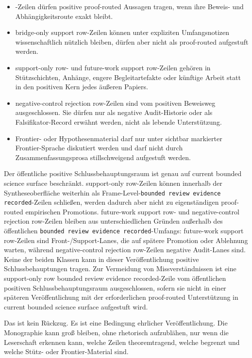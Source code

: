 \begin{itemize}
\item {}-Zeilen dürfen positive proof-routed
      Aussagen tragen, wenn ihre Beweis- und Abhängigkeitsroute exakt bleibt.
\item bridge-only support row-Zeilen können unter expliziten Umfangsnotizen
      wissenschaftlich nützlich bleiben, dürfen aber nicht als proof-routed
      aufgestuft werden.
\item support-only row- und future-work support row-Zeilen gehören in
      Stützschichten, Anhänge, engere Begleitartefakte oder künftige Arbeit
      statt in den positiven Kern jedes äußeren Papiers.
\item negative-control rejection row-Zeilen sind vom positiven Beweisweg ausgeschlossen.
      Sie dürfen nur als negative Audit-Historie oder als Falsifikator-Record
      erwähnt werden, nicht als lebende Unterstützung.
\item Frontier- oder Hypothesenmaterial darf nur unter sichtbar markierter
      Frontier-Sprache diskutiert werden und darf nicht durch
      Zusammenfassungsprosa stillschweigend aufgestuft werden.
\end{itemize}

Der öffentliche positive Schlussbehauptungsraum ist genau auf
current bounded science surface beschränkt. support-only row-Zeilen können
innerhalb der Syntheseoberfläche weiterhin als Frame-Level-\texttt{bounded review evidence recorded}-Zeilen
schließen, werden dadurch aber nicht zu eigenständigen proof-routed
empirischen Promotions. future-work support row- und negative-control rejection row-Zeilen
bleiben aus unterschiedlichen Gründen außerhalb des öffentlichen
\texttt{bounded review evidence recorded}-Umfangs: future-work support row-Zeilen sind Front-/Support-Lanes, die
auf spätere Promotion oder Ablehnung warten, während
negative-control rejection row-Zeilen negative Audit-Lanes sind. Keine der beiden Klassen
kann in dieser Veröffentlichung positive Schlussbehauptungen tragen.
Zur Vermeidung von Missverständnissen ist eine support-only row
bounded review evidence recorded-Zeile vom öffentlichen positiven Schlussbehauptungsraum
ausgeschlossen, sofern sie nicht in einer späteren Veröffentlichung mit der
erforderlichen proof-routed Unterstützung in current bounded science surface
aufgestuft wird.

Das ist kein Rückzug. Es ist eine Bedingung ehrlicher Veröffentlichung. Die
Monographie kann groß bleiben, ohne rhetorisch aufzublähen, nur wenn die
Leserschaft erkennen kann, welche Zeilen theoremtragend, welche begrenzt und
welche Stütz- oder Frontier-Material sind.

